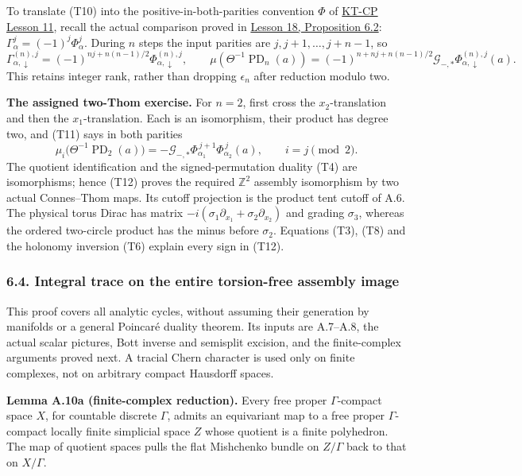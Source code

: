 \documentclass[
  11pt,
]{article}
\begin{document}
To translate (T10) into the positive-in-both-parities convention
\(\Phi\) of
\href{../KT-CP/KT-CP-11.html\#iteration-in-ordered-coordinates}{KT-CP
Lesson 11}, recall the actual comparison proved in
\href{KT-KK-18.html\#6-the-fack-skandalis-argument}{Lesson 18,
Proposition 6.2}: \(\Gamma_\alpha^j=(-1)^j\Phi_\alpha^j\). During \(n\)
steps the input parities are \(j,j+1,\ldots,j+n-1\), so \[
 \Gamma_{\alpha,\downarrow}^{(n),j}
     =(-1)^{nj+n(n-1)/2}\Phi_{\alpha,\downarrow}^{(n),j},
 \qquad
 \mu(\Theta^{-1}\operatorname{PD}_n(a))
     =(-1)^{n+nj+n(n-1)/2}
                  {\mathcal G}_{-,*}\Phi_{\alpha,\downarrow}^{(n),j}(a).
 \tag{T11}
\] This retains integer rank, rather than dropping \(\epsilon_n\) after
reduction modulo two.

\textbf{The assigned two-Thom exercise.} For \(n=2\), first cross the
\(x_2\)-translation and then the \(x_1\)-translation. Each is an
isomorphism, their product has degree two, and (T11) says in both
parities \[
 \mu_i\bigl(\Theta^{-1}\operatorname{PD}_2(a)\bigr)
       =-{\mathcal G}_{-,*}
                 \Phi_{\alpha_1}^{\,j+1}\Phi_{\alpha_2}^{\,j}(a),
 \qquad i=j\pmod2.
 \tag{T12}
\] The quotient identification and the signed-permutation duality (T4)
are isomorphisms; hence (T12) proves the required \(\mathbb Z^2\)
assembly isomorphism by two actual Connes--Thom maps. Its cutoff
projection is the product tent cutoff of A.6. The physical torus Dirac
has matrix \(-i(\sigma_1\partial_{x_1}+\sigma_2\partial_{x_2})\) and
grading \(\sigma_3\), whereas the ordered two-circle product has the
minus before \(\sigma_2\). Equations (T3), (T8) and the holonomy
inversion (T6) explain every sign in (T12).

\subsubsection{6.4. Integral trace on the entire torsion-free assembly
image}\label{integral-trace-on-the-entire-torsion-free-assembly-image}

This proof covers all analytic cycles, without assuming their generation
by manifolds or a general Poincaré duality theorem. Its inputs are
A.7--A.8, the actual scalar pictures, Bott inverse and semisplit
excision, and the finite-complex arguments proved next. A tracial Chern
character is used only on finite complexes, not on arbitrary compact
Hausdorff spaces.

\textbf{Lemma A.10a (finite-complex reduction).} Every free proper
\(\Gamma\)-compact space \(X\), for countable discrete \(\Gamma\),
admits an equivariant map to a free proper \(\Gamma\)-compact locally
finite simplicial space \(Z\) whose quotient is a finite polyhedron. The
map of quotient spaces pulls the flat Mishchenko bundle on \(Z/\Gamma\)
back to that on \(X/\Gamma\).
\end{document}
